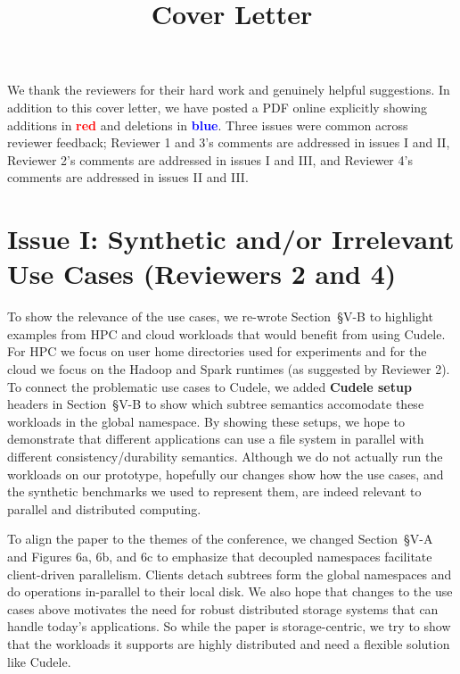 \documentclass[onecolumn,conference]{IEEEtran}
\begin{document}
\title{Cover Letter}
\maketitle

We thank the reviewers for their hard work and genuinely helpful suggestions.
In addition to this cover letter, we have posted a PDF online explicitly
showing additions in \textcolor{red}{\textbf{red}} and deletions in
\textcolor{blue}{\textbf{blue}}. Three issues were common across reviewer
feedback; Reviewer 1 and 3's comments are addressed in issues I and II,
Reviewer 2's comments are addressed in issues I and III, and Reviewer 4's
comments are addressed in issues II and III. 

\section*{Issue I: Synthetic and/or Irrelevant Use Cases (Reviewers 2 and 4)}

To show the relevance of the use cases, we re-wrote Section~{\S}V-B to
highlight examples from HPC and cloud workloads that would benefit from using
Cudele. For HPC we focus on user home directories used for experiments and for
the cloud we focus on the Hadoop and Spark runtimes (as suggested by Reviewer
2). To connect the problematic use cases to Cudele, we added \textbf{Cudele
setup} headers in Section~{\S}V-B to show which subtree semantics accomodate
these workloads in the global namespace.  By showing these setups, we hope to
demonstrate that different applications can use a file system in parallel with
different consistency/durability semantics.  Although we do not actually run
the workloads on our prototype, hopefully our changes show how the use cases,
and the synthetic benchmarks we used to represent them, are indeed relevant to
parallel and distributed computing.

To align the paper to the themes of the conference, we changed Section~{\S}V-A
and Figures 6a, 6b, and 6c to emphasize that decoupled namespaces facilitate
client-driven parallelism. Clients detach subtrees form the global namespaces
and do operations in-parallel to their local disk. We also hope that changes to
the use cases above motivates the need for robust distributed storage systems
that can handle today's applications.  So while the paper is storage-centric,
we try to show that the workloads it supports are highly distributed and need a
flexible solution like Cudele.  
\end{document}
